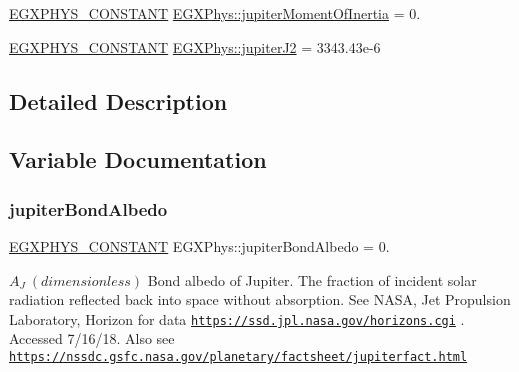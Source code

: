 \begin{DoxyCompactItemize}
\item 
\mbox{\hyperlink{group___e_g_x_phys-_constants-_macros_ga76980d288494ce1714c9ac68a95ba702}{E\+G\+X\+P\+H\+Y\+S\+\_\+\+C\+O\+N\+S\+T\+A\+NT}} \mbox{\hyperlink{group___e_g_x_phys-_constants-_astrophysics-_solar_system-_jupiter-_bulk_ga50587ad8262cc8af606d31ba2cc00e37}{E\+G\+X\+Phys\+::jupiter\+Moment\+Of\+Inertia}} = 0.
\item 
\mbox{\hyperlink{group___e_g_x_phys-_constants-_macros_ga76980d288494ce1714c9ac68a95ba702}{E\+G\+X\+P\+H\+Y\+S\+\_\+\+C\+O\+N\+S\+T\+A\+NT}} \mbox{\hyperlink{group___e_g_x_phys-_constants-_astrophysics-_solar_system-_jupiter-_bulk_ga846f4c33b3e4089181cf11106c1a1441}{E\+G\+X\+Phys\+::jupiter\+J2}} = 3343.\+43e-\/6
\end{DoxyCompactItemize}


\subsection{Detailed Description}


\subsection{Variable Documentation}
\mbox{\label{group___e_g_x_phys-_constants-_astrophysics-_solar_system-_jupiter-_bulk_ga874898a1cbfefdbef696c7043cfc722e}} 
\subsubsection{\texorpdfstring{jupiter\+Bond\+Albedo}{jupiterBondAlbedo}}
{\footnotesize\ttfamily \mbox{\hyperlink{group___e_g_x_phys-_constants-_macros_ga76980d288494ce1714c9ac68a95ba702}{E\+G\+X\+P\+H\+Y\+S\+\_\+\+C\+O\+N\+S\+T\+A\+NT}} E\+G\+X\+Phys\+::jupiter\+Bond\+Albedo = 0.}

$ A_{J} \ (dimensionless)$ Bond albedo of Jupiter. The fraction of incident solar radiation reflected back into space without absorption. See N\+A\+SA, Jet Propulsion Laboratory, Horizon for data \href{https://ssd.jpl.nasa.gov/horizons.cgi}{\tt https\+://ssd.\+jpl.\+nasa.\+gov/horizons.\+cgi} . Accessed 7/16/18. Also see \href{https://nssdc.gsfc.nasa.gov/planetary/factsheet/jupiterfact.html}{\tt https\+://nssdc.\+gsfc.\+nasa.\+gov/planetary/factsheet/jupiterfact.\+html} \mbox{\label{group___e_g_x_phys-_constants-_astrophysics-_solar_system-_jupiter-_bulk_gafc5e9529e45112431da46f9433c300ed}} 
